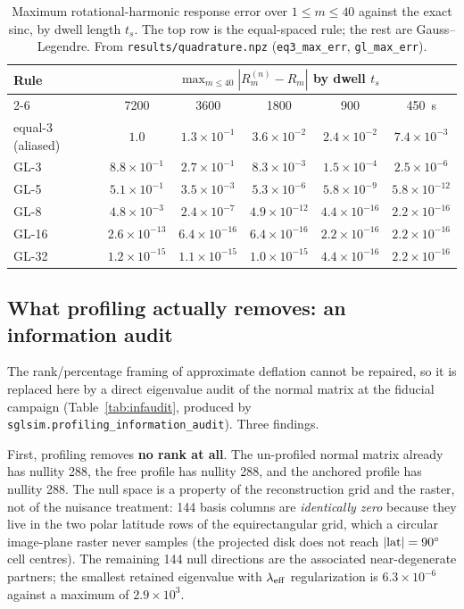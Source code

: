 \documentclass[twocolumn,10pt]{article}
\begin{document}
\begin{table}[t]
\centering
\caption{Maximum rotational-harmonic response error over $1\le m\le40$
against the exact sinc, by dwell length $t_s$. The top row is the equal-spaced
rule; the rest are Gauss--Legendre. From
{\tt results/quadrature.npz} (\texttt{eq3\_max\_err}, \texttt{gl\_max\_err}).}
\label{tab:quad}
\footnotesize
\setlength{\tabcolsep}{3pt}
\begin{tabular}{lccccc}
\toprule
Rule & \multicolumn{5}{c}{$\max_{m\le40}|R_m^{(n)}-R_m|$ by dwell $t_s$}\\
\cmidrule(lr){2-6}
 & 7200 & 3600 & 1800 & 900 & 450~s\\
\midrule
equal-3 (aliased) & $1.0$    & $1.3\times10^{-1}$ & $3.6\times10^{-2}$ & $2.4\times10^{-2}$ & $7.4\times10^{-3}$\\
GL-3  & $8.8\times10^{-1}$ & $2.7\times10^{-1}$ & $8.3\times10^{-3}$ & $1.5\times10^{-4}$ & $2.5\times10^{-6}$\\
GL-5  & $5.1\times10^{-1}$ & $3.5\times10^{-3}$ & $5.3\times10^{-6}$ & $5.8\times10^{-9}$ & $5.8\times10^{-12}$\\
GL-8  & $4.8\times10^{-3}$ & $2.4\times10^{-7}$ & $4.9\times10^{-12}$ & $4.4\times10^{-16}$ & $2.2\times10^{-16}$\\
GL-16 & $2.6\times10^{-13}$ & $6.4\times10^{-16}$ & $6.4\times10^{-16}$ & $2.2\times10^{-16}$ & $2.2\times10^{-16}$\\
GL-32 & $1.2\times10^{-15}$ & $1.1\times10^{-15}$ & $1.0\times10^{-15}$ & $4.4\times10^{-16}$ & $2.2\times10^{-16}$\\
\bottomrule
\end{tabular}
\end{table}

\subsection{What profiling actually removes: an information audit}
\label{sec:infaudit}
The rank/percentage framing of approximate deflation cannot be repaired,
so it is replaced here by a direct eigenvalue audit of the normal matrix at the
fiducial campaign (Table~\ref{tab:infaudit}, produced by
{\tt sglsim.profiling\_information\_audit}). Three findings.

First, profiling removes \textbf{no rank at all}. The un-profiled normal matrix
already has nullity 288, the free profile has nullity 288, and the anchored
profile has nullity 288. The null space is a property of the reconstruction
grid and the raster, not of the nuisance treatment: 144 basis columns are
\emph{identically zero} because they live in the two polar latitude rows of the
equirectangular grid, which a circular image-plane raster never samples (the
projected disk does not reach $|{\rm lat}|=90^\circ$ cell centres). The
remaining 144 null directions are the associated near-degenerate partners; the
smallest retained eigenvalue with $\lambda_{\rm eff}$ regularization is
$6.3\times10^{-6}$ against a maximum of $2.9\times10^{3}$.
\end{document}
